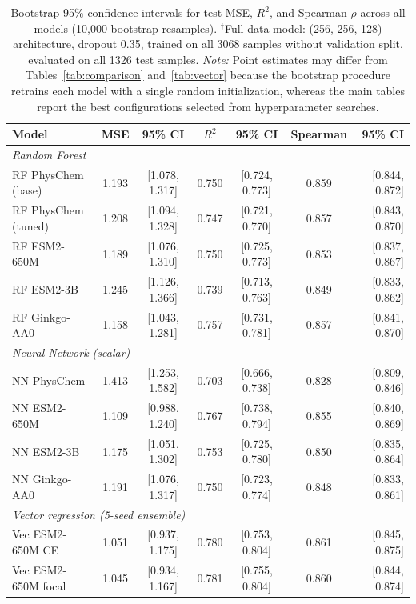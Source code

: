 \documentclass[12pt]{article}
\begin{document}
\begin{table}[H]
\centering
\caption{Bootstrap 95\% confidence intervals for test MSE, $R^2$, and Spearman $\rho$ across all models (10{,}000 bootstrap resamples). $^\dagger$Full-data model: (256, 256, 128) architecture, dropout 0.35, trained on all 3068 samples without validation split, evaluated on all 1326 test samples. \textit{Note:} Point estimates may differ from Tables~\ref{tab:comparison} and~\ref{tab:vector} because the bootstrap procedure retrains each model with a single random initialization, whereas the main tables report the best configurations selected from hyperparameter searches.}
\label{tab:bootstrap}
\small
\begin{tabular}{lcccccr}
\toprule
Model & MSE & 95\% CI & $R^2$ & 95\% CI & Spearman & 95\% CI \\
\midrule
\multicolumn{7}{l}{\textit{Random Forest}} \\
RF PhysChem (base) & 1.193 & [1.078, 1.317] & 0.750 & [0.724, 0.773] & 0.859 & [0.844, 0.872] \\
RF PhysChem (tuned) & 1.208 & [1.094, 1.328] & 0.747 & [0.721, 0.770] & 0.857 & [0.843, 0.870] \\
RF ESM2-650M & 1.189 & [1.076, 1.310] & 0.750 & [0.725, 0.773] & 0.853 & [0.837, 0.867] \\
RF ESM2-3B & 1.245 & [1.126, 1.366] & 0.739 & [0.713, 0.763] & 0.849 & [0.833, 0.862] \\
RF Ginkgo-AA0 & 1.158 & [1.043, 1.281] & 0.757 & [0.731, 0.781] & 0.857 & [0.841, 0.870] \\
\midrule
\multicolumn{7}{l}{\textit{Neural Network (scalar)}} \\
NN PhysChem & 1.413 & [1.253, 1.582] & 0.703 & [0.666, 0.738] & 0.828 & [0.809, 0.846] \\
NN ESM2-650M & 1.109 & [0.988, 1.240] & 0.767 & [0.738, 0.794] & 0.855 & [0.840, 0.869] \\
NN ESM2-3B & 1.175 & [1.051, 1.302] & 0.753 & [0.725, 0.780] & 0.850 & [0.835, 0.864] \\
NN Ginkgo-AA0 & 1.191 & [1.076, 1.317] & 0.750 & [0.723, 0.774] & 0.848 & [0.833, 0.861] \\
\midrule
\multicolumn{7}{l}{\textit{Vector regression (5-seed ensemble)}} \\
Vec ESM2-650M CE & 1.051 & [0.937, 1.175] & 0.780 & [0.753, 0.804] & 0.861 & [0.845, 0.875] \\
Vec ESM2-650M focal & 1.045 & [0.934, 1.167] & 0.781 & [0.755, 0.804] & 0.860 & [0.844, 0.874] \\

\end{tabular}
\end{table}
\end{document}
